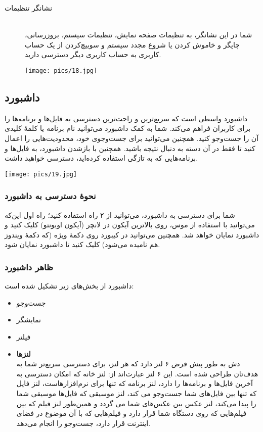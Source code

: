 \begin{description}
\item[نشانگر تنظیمات] \hfill \\
شما در این نشانگر، به تنظیمات صفحه نمایش، تنظیمات سیستم، بروزرسانی، چاپگر و خاموش کردن یا شروع مجدد سیستم و سوییچ‌کردن از یک حساب کاربری به حساب کاربری دیگر دسترسی دارید.
\begin{center}
\texttt{[image: pics/18.jpg]}
\end{center}

\end{description}

\subsection{داشبورد}
داشبورد واسطی است که سریع‌ترین و راحت‌ترین دسترسی به فایل‌ها و برنامه‌ها را برای کاربران فراهم می‌کند. شما به کمک داشبورد می‌توانید نام برنامه یا کلمهٔ کلیدی آن را جست‌وجو کنید. همچنین می‌توانید برای جست‌وجوی خود، محدودیت‌هایی را اعمال کنید تا فقط در آن دسته به دنبال نتیجه باشید. همچنین با بازشدن داشبورد، به فایل‌ها و برنامه‌هایی که به تازگی استفاده کرده‌اید، دسترسی خواهید داشت.
\begin{center}
\texttt{[image: pics/19.jpg]}
\end{center}

\subsubsection{نحوهٔ دسترسی به داشبورد}
شما برای دسترسی به داشبورد، می‌توانید از ۲ راه استفاده کنید؛ راه اول این‌که می‌توانید با استفاده از موس، روی بالاترین آیکون در لانچر (آیکون اوبونتو) کلیک کنید و داشبورد نمایان خواهد شد. همچنین می‌توانید در کیبورد روی دکمهٔ ویژه (که دکمهٔ ویندوز هم نامیده می‌شود) کلیک کنید تا داشبورد نمایان شود.

\subsubsection{ظاهر داشبورد}
داشبورد از بخش‌های زیر تشکیل شده است:
\begin{itemize}
\item جست‌وجو
\item نمایشگر
\item فیلتر
\item \textbf{لنزها}\\
دش به طور پیش فرض ۶ لنز دارد که هر لنز، برای دسترسی سریع‌تر شما به هدف‌تان طراحی شده است. این ۶ لنز عبارت‌اند از: لنز خانه که امکان دسترسی به آخرین فایل‌ها و برنامه‌ها را دارد، لنز برنامه که تنها برای نرم‌افزارهاست، لنز فایل که تنها بین فایل‌های شما جست‌وجو می کند، لنز موسیقی که فایل‌ها موسیقی شما را پیدا می‌کند، لنز عکس بین عکس‌های شما می گردد و همین‌طور لنز فیلم که بین فیلم‌هایی که روی دستگاه شما قرار دارد و فیلم‌هایی که با آن موضوع در فضای اینترنت قرار دارد، جست‌وجو را انجام می‌دهد.
\end{itemize}

